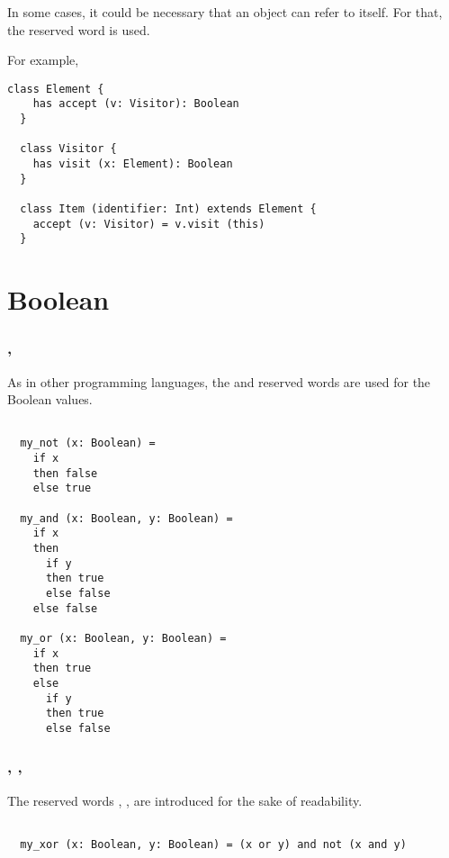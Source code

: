 \documentclass[12pt,a4paper]{book}
\begin{document}
    \subsubsection{\sthis}

    In some cases, it could be necessary that an object can refer to itself.
    For that, the \sthis reserved word is used.

    For example,
    \begin{lstlisting}[label={lst:exampleExtendsElement}]
  class Element {
    has accept (v: Visitor): Boolean
  }

  class Visitor {
    has visit (x: Element): Boolean
  }

  class Item (identifier: Int) extends Element {
    accept (v: Visitor) = v.visit (this)
  }
    \end{lstlisting}


    \section{Boolean}

    \subsubsection{\sfalse, \strue}

    As in other programming languages, the \sfalse and \strue reserved words are used for the Boolean values.

    \begin{lstlisting}[label={lst:exampleFalseTrue}]

  my_not (x: Boolean) =
    if x
    then false
    else true

  my_and (x: Boolean, y: Boolean) =
    if x
    then
      if y
      then true
      else false
    else false

  my_or (x: Boolean, y: Boolean) =
    if x
    then true
    else
      if y
      then true
      else false
    \end{lstlisting}

    \subsubsection{\snot, \sand, \sor}

    The reserved words \snot, \sand, \sor are introduced for the sake of readability.

    \begin{lstlisting}[label={lst:exampleNotAndOr}]

  my_xor (x: Boolean, y: Boolean) = (x or y) and not (x and y)

    \end{lstlisting}
\end{document}

